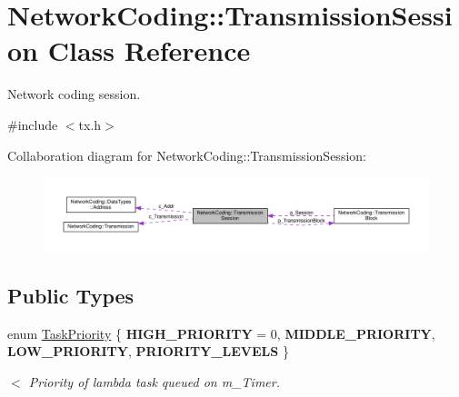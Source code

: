 \hypertarget{class_network_coding_1_1_transmission_session}{}\section{Network\+Coding\+:\+:Transmission\+Session Class Reference}
\label{class_network_coding_1_1_transmission_session}


Network coding session.  




{\ttfamily \#include $<$tx.\+h$>$}



Collaboration diagram for Network\+Coding\+:\+:Transmission\+Session\+:\nopagebreak
\begin{figure}[H]
\begin{center}
\leavevmode
\includegraphics[width=350pt]{class_network_coding_1_1_transmission_session__coll__graph}
\end{center}
\end{figure}
\subsection*{Public Types}
\begin{DoxyCompactItemize}
\item 
enum \hyperlink{class_network_coding_1_1_transmission_session_aa224de09cc46cfd07df11e4ddeff7472}{Task\+Priority} \{ {\bfseries H\+I\+G\+H\+\_\+\+P\+R\+I\+O\+R\+I\+TY} = 0, 
{\bfseries M\+I\+D\+D\+L\+E\+\_\+\+P\+R\+I\+O\+R\+I\+TY}, 
{\bfseries L\+O\+W\+\_\+\+P\+R\+I\+O\+R\+I\+TY}, 
{\bfseries P\+R\+I\+O\+R\+I\+T\+Y\+\_\+\+L\+E\+V\+E\+LS}
 \}\hypertarget{class_network_coding_1_1_transmission_session_aa224de09cc46cfd07df11e4ddeff7472}{}\label{class_network_coding_1_1_transmission_session_aa224de09cc46cfd07df11e4ddeff7472}
\begin{DoxyCompactList}\small\item\em $<$ Priority of lambda task queued on m\+\_\+\+Timer. \end{DoxyCompactList}
\end{DoxyCompactItemize}

